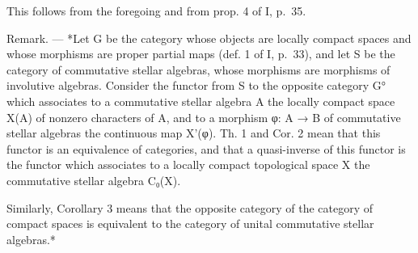 This follows from the foregoing and from prop. 4 of I, p.~35.

Remark. --- *Let G be the category whose objects are locally compact spaces and whose morphisms are proper partial maps (def. 1 of I, p.~33), and let S be the category of commutative stellar algebras, whose morphisms are morphisms of involutive algebras. Consider the functor from S to the opposite category G° which associates to a commutative stellar algebra A the locally compact space X(A) of nonzero characters of A, and to a morphism φ: A → B of commutative stellar algebras the continuous map X'(φ). Th. 1 and Cor. 2 mean that this functor is an equivalence of categories, and that a quasi-inverse of this functor is the functor which associates to a locally compact topological space X the commutative stellar algebra C₀(X).

Similarly, Corollary 3 means that the opposite category of the category of compact spaces is equivalent to the category of unital commutative stellar algebras.*

